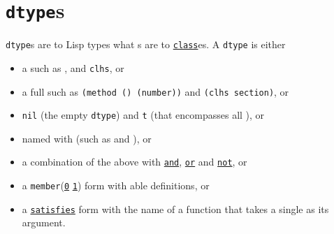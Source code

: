 \section{\texorpdfstring{\texttt{dtype}s}{dtypes}}\label{dtypes}

\label{x-28DREF-3A-40DTYPES-20MGL-PAX-3ASECTION-29}

\texttt{dtype}s are to Lisp types what
s are to
\href{http://www.lispworks.com/documentation/HyperSpec/Body/t_class.htm}{\texttt{class}}es.
A \texttt{dtype} is either

\begin{itemize}
\item
  a
   such as
  ,
   and
  \texttt{clhs}, or
\item
  a full
  such as \texttt{(method\ ()\ (number))} and \texttt{(clhs\ section)},
  or
\item
  \texttt{nil} (the empty \texttt{dtype}) and \texttt{t} (that
  encompasses all
  ),
  or
\item
  named with
  (such as
   and
  ), or
\item
  a combination of the above with
  \href{http://www.lispworks.com/documentation/HyperSpec/Body/t_and.htm}{\texttt{and}},
  \href{http://www.lispworks.com/documentation/HyperSpec/Body/t_or.htm}{\texttt{or}}
  and
  \href{http://www.lispworks.com/documentation/HyperSpec/Body/t_not.htm}{\texttt{not}},
  or
\item
  a
  \texttt{member}(\href{http://www.lispworks.com/documentation/HyperSpec/Body/t_mem_m.htm}{\texttt{0}}
  \href{http://www.lispworks.com/documentation/HyperSpec/Body/t_member.htm}{\texttt{1}})
  form with
  able
  definitions, or
\item
  a
  \href{http://www.lispworks.com/documentation/HyperSpec/Body/t_satisf.htm}{\texttt{satisfies}}
  form with the name of a function that takes a single
  as its argument.
\end{itemize}

